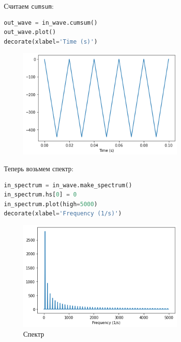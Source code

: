 \documentclass[a4paper,12pt]{report}
\begin{document}
    Считаем \texttt{cumsum}:
    
\begin{lstlisting}[language=Python,caption=\textquote{Просуммированный}]
out_wave = in_wave.cumsum()
out_wave.plot()
decorate(xlabel='Time (s)')
\end{lstlisting}

    \begin{figure}[H]
        \centering
        \includegraphics[width=0.75\textwidth]{ex2_out_wave.png}
        \caption{}
        \label{fig:ex2_out_wave}
    \end{figure}

    Теперь возьмем спектр:
    
\begin{lstlisting}[language=Python,caption=Спектр]
in_spectrum = in_wave.make_spectrum()
in_spectrum.hs[0] = 0
in_spectrum.plot(high=5000)
decorate(xlabel='Frequency (1/s)')
\end{lstlisting}

    \begin{figure}[H]
        \centering
        \includegraphics[width=0.75\textwidth]{ex2_in_spectrum.png}
        \caption{Спектр}
        \label{fig:ex2_in_spectrum}
    \end{figure}
\end{document}
